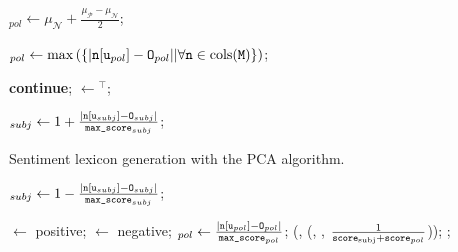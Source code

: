 \begin{algorithm}
\begin{algorithmic}[1]
    \State{}$_{pol}\gets\mu_{\mathcal{N}} + \frac{\mu_{\mathcal{P}} -
    \mu_{\mathcal{N}}}{2}$;

    \State{}$_{pol}\gets\max\left(\{|\vars{n}\lbrack\vars{u}_{pol}\rbrack%
      - \vars{O}_{pol}| |\forall\vars{n}\in\func{cols}(\vars{M})\}\right)$;

    \State \textbf{continue};
    \EndIf
    \State {}$\gets$$^\top$;


    \State{}$_{subj}\gets 1 + %
    \frac{|\vars{n}\lbrack\vars{u}_{subj}\rbrack - \vars{O}_{subj}|}{\vars{max\_score}_{subj}}$;
  \end{algorithmic}
  \caption[Sentiment lexicon generation using PCA.]{Sentiment lexicon
    generation with the PCA algorithm.}\label{snt:lex:alg:pca}
\end{algorithm}

\begin{algorithm}
  \begin{algorithmic}[1]
    \Else
    \State{}$_{subj}\gets 1 - %
    \frac{|\vars{n}\lbrack\vars{u}_{subj}\rbrack - \vars{O}_{subj}|}{\vars{max\_score}_{subj}}$;
    \EndIf


    \State{}$\gets$ positive;
    \Else
    \State {}$\gets$ negative;
    \EndIf
    \State{}$_{pol}\gets%
    \frac{|\vars{n}\lbrack\vars{u}_{pol}\rbrack %
      - \vars{O}_{pol}|}{\vars{max\_score}_{pol}}$;
    \State{}(,
    (, , %
    $\frac{1}{\texttt{score}_{\textrm{subj}} + \texttt{score}_{pol}}$));
    \Statex{}
    \EndFor
    \State\Return{};
    \EndFunction
  \end{algorithmic}
\end{algorithm}

